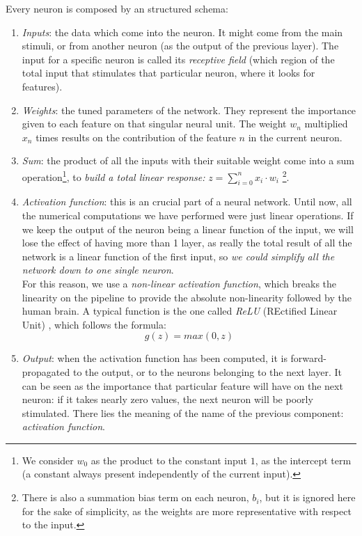 \vspace{0.3in}
Every neuron is composed by an structured schema:
\begin{enumerate}
	\item \emph{Inputs}: the data which come into the neuron. It might come from the main stimuli, or from another neuron (as the output of the previous layer). The input for a specific neuron is called its \emph{receptive field} (which region of the total input that stimulates that particular neuron, where it looks for features).
	\item \emph{Weights}: the tuned parameters of the network. They represent the importance given to each feature on that singular neural unit. The weight $w_n$ multiplied $x_n$ times results on the contribution of the feature $n$ in the current neuron. 
	\item \emph{Sum}: the product of all the inputs with their suitable weight come into a sum operation\footnote{We consider $w_0$ as the product to the constant input $1$, as the intercept term (a constant always present independently of the current input).}, to \textit{build a total linear response:} $ z = \sum_{i=0}^{n}x_i \cdot w_i$  \footnote{There is also a summation bias term on each neuron, $b_i$, but it is ignored here for the sake of simplicity, as the weights are more representative with respect to the input.}.
	\item \emph{Activation function}: this is an crucial part of a neural network. Until now, all the numerical computations we have performed were just linear operations. If we keep the output of the neuron being a linear function of the input, we will lose the effect of having more than 1 layer, as really the total result of all the network is a linear function of the first input, so \emph{we could simplify all the network down to one single neuron}. \\
	
	For this reason, we use a \textit{non-linear activation function}, which breaks the linearity on the pipeline to provide the absolute non-linearity followed by the human brain. A typical function is the one called \emph{ReLU} (REctified Linear Unit) \cite{relu}, which follows the formula:
	\begin{equation}
		g(z) = max(0, z)
		\label{eqn:1_relu}
	\end{equation}
	
	\item \emph{Output}: when the activation function has been computed, it is forward-propagated to the output, or to the neurons belonging to the next layer. It can be seen as the importance that particular feature will have on the next neuron: if it takes nearly zero values, the next neuron will be poorly stimulated. There lies the meaning of the name of the previous component: \emph{activation function}.\\
	

\end{enumerate}
